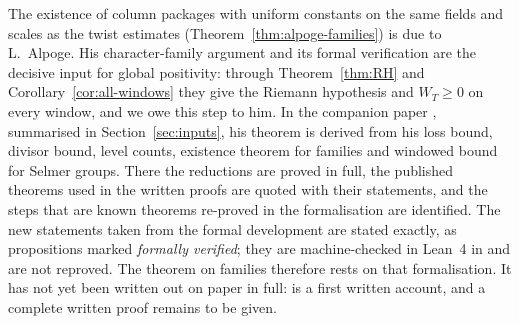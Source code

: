\documentclass[10pt]{amsart}
\theoremstyle{definition}
\theoremstyle{remark}
\begin{document}
The existence of column packages with uniform constants on the same fields
and scales as the twist estimates (Theorem~\ref{thm:alpoge-families}) is due
to L.~Alpoge. His character-family argument and its formal verification
\cite{CharacterFamily} are the decisive input for global positivity: through
Theorem~\ref{thm:RH} and Corollary~\ref{cor:all-windows} they give the
Riemann hypothesis and $W_T\ge0$ on every window, and we owe this step to
him. In the companion paper \cite{Annex}, summarised in
Section~\ref{sec:inputs}, his theorem is derived from his loss bound,
divisor bound, level counts, existence theorem for families and windowed
bound for Selmer groups. There the reductions are proved in full, the
published theorems used in the written proofs are quoted with their
statements, and the steps that are known theorems re-proved in the
formalisation are identified. The new statements taken from the formal
development are stated exactly, as propositions marked \emph{formally
verified}; they are machine-checked in Lean~4 in \cite{CharacterFamily} and
are not reproved. The theorem on families therefore rests on that
formalisation. It has not yet been written out on paper in full:
\cite{Annex} is a first written account, and a complete written proof
remains to be given.
\end{document}
